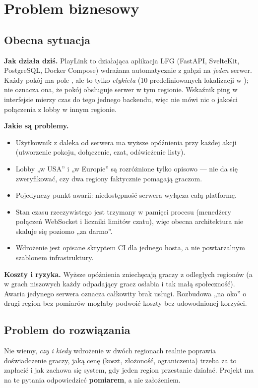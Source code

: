\section{Problem biznesowy}

\subsection{Obecna sytuacja}
\textbf{Jak działa dziś.} PlayLink to działająca aplikacja LFG (FastAPI, SvelteKit,
PostgreSQL, Docker Compose) wdrażana automatycznie z gałęzi  na
\emph{jeden} serwer. Każdy pokój ma pole , ale to tylko
\emph{etykieta} (10 predefiniowanych lokalizacji w ); nie
oznacza ona, że pokój obsługuje serwer w tym regionie. Wskaźnik ping w interfejsie
mierzy czas do tego jednego backendu, więc nie mówi nic o jakości połączenia z
lobby w innym regionie.

\textbf{Jakie są problemy.}
\begin{itemize}
  \item Użytkownik z daleka od serwera ma wyższe opóźnienia przy każdej akcji
        (utworzenie pokoju, dołączenie, czat, odświeżenie listy).
  \item Lobby „w USA'' i „w Europie'' są rozróżnione tylko opisowo --- nie da się
        zweryfikować, czy dwa regiony faktycznie pomagają graczom.
  \item Pojedynczy punkt awarii: niedostępność serwera wyłącza całą platformę.
  \item Stan czasu rzeczywistego jest trzymany w pamięci procesu
        (menedżery połączeń WebSocket i liczniki limitów czatu), więc obecna
        architektura nie skaluje się poziomo „za darmo''.
  \item Wdrożenie jest opisane skryptem CI dla jednego hosta, a nie powtarzalnym
        szablonem infrastruktury.
\end{itemize}

\textbf{Koszty i ryzyka.} Wyższe opóźnienia zniechęcają graczy z odległych
regionów (a w grach niszowych każdy odpadający gracz osłabia i tak małą
społeczność). Awaria jedynego serwera oznacza całkowity brak usługi. Rozbudowa „na
oko'' o drugi region bez pomiarów mogłaby podwoić koszty bez udowodnionej korzyści.

\subsection{Problem do rozwiązania}
Nie wiemy, \emph{czy i kiedy} wdrożenie w dwóch regionach realnie poprawia
doświadczenie graczy, jaką cenę (koszt, złożoność, ograniczenia) trzeba za to
zapłacić i jak zachowa się system, gdy jeden region przestanie działać. Projekt ma
na te pytania odpowiedzieć \textbf{pomiarem}, a nie założeniem.

